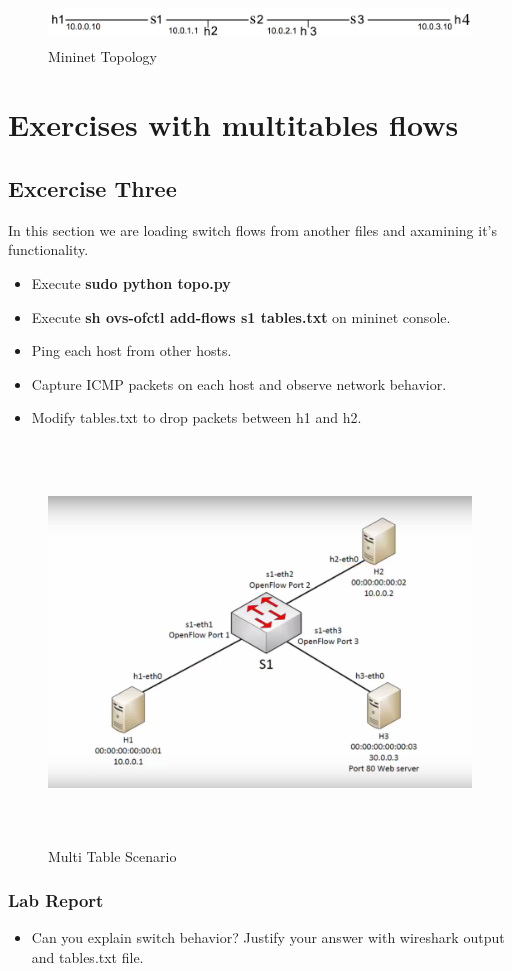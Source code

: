 \documentclass[10pt,a4paper]{article}
\numberwithin{equation}{section}
\numberwithin{figure}{section}
\numberwithin{table}{section}
\begin{document}
\begin{figure}[H]
	\centering
	\includegraphics[height=30pt]{img/fig1.png}
	\caption{Mininet Topology}
	\label{fig:linearRouters}
\end{figure}


\section{Exercises with multitables flows}
\subsection*{Excercise Three}
In this section we are loading switch flows from another files and axamining it's functionality.

\begin{itemize}
	\setlength{\itemindent}{10pt}
	\item Execute \textbf{sudo python topo.py} 
	\item Execute \textbf{sh ovs-ofctl add-flows s1 tables.txt} on mininet console.
	\item Ping each host from other hosts.
	\item Capture ICMP packets on each host and observe network behavior.
	\item Modify tables.txt to drop packets between h1 and h2.
\end{itemize}

\begin{figure}[H]
	\centering
	\includegraphics[height=300pt]{img/fig2.png}
	\caption{Multi Table Scenario}
	\label{fig:MultiTableScenario}
\end{figure}


\subsubsection*{ Lab Report}
\begin{itemize}
	\setlength{\itemindent}{0pt}
	\item Can you explain switch behavior? Justify your answer with wireshark output and tables.txt file.
\end{itemize}
\end{document}
